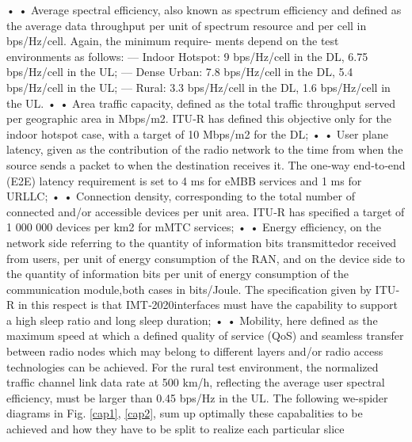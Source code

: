 \documentclass{report}
\begin{document}
• •
 Average spectral efficiency, also known as spectrum efficiency and defined as the average data
throughput per unit of spectrum resource and per cell in bps/Hz/cell. Again, the minimum require-
ments depend on the test environments as follows:
–– Indoor Hotspot: 9 bps/Hz/cell in the DL, 6.75 bps/Hz/cell in the UL;
–– Dense Urban: 7.8 bps/Hz/cell in the DL, 5.4 bps/Hz/cell in the UL;
–– Rural: 3.3 bps/Hz/cell in the DL, 1.6 bps/Hz/cell in the UL.
• •
 Area traffic capacity, defined as the total traffic throughput served per geographic area in Mbps/m2.
ITU‐R has defined this objective only for the indoor hotspot case, with a target of 10 Mbps/m2 for
the DL;
• •
 User plane latency, given as the contribution of the radio network to the time from when the
source sends a packet to when the destination receives it. The one‐way end‐to‐end (E2E) latency
requirement is set to 4 ms for eMBB services and 1 ms for URLLC;
• •
 Connection density, corresponding to the total number of connected and/or accessible devices
per unit area. ITU‐R has specified a target of 1 000 000 devices per km2 for mMTC services;
• •
 Energy efficiency, on the network side referring to the quantity of information bits transmittedor received from users, per unit of energy consumption of the RAN, and on the device side to the
quantity of information bits per unit of energy consumption of the communication module,both cases in bits/Joule. The specification given by ITU‐R in this respect is that IMT‐2020interfaces must have the capability to support a high sleep ratio and long sleep duration;
• •
 Mobility, here defined as the maximum speed at which a defined quality of service (QoS) and
seamless transfer between radio nodes which may belong to different layers and/or radio access
technologies can be achieved. For the rural test environment, the normalized traffic channel link
data rate at 500 km/h, reflecting the average user spectral efficiency, must be larger than 0.45 bps/Hz
in the UL.
The following we-spider diagrams in Fig. \ref{cap1}, \ref{cap2}, sum up optimally these capabalities to be achieved and how they have to be split to realize each particular slice
\end{document}
